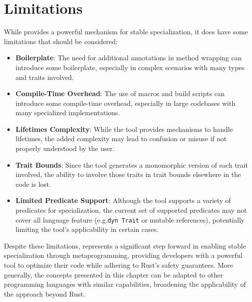 \section{Limitations}\label{sec:limitations}
While \mytool{} provides a powerful mechanism for stable specialization, it does have some limitations that should be considered:
\begin{itemize}
	\item \textbf{Boilerplate}: The need for additional annotations in method wrapping can introduce some boilerplate, especially in complex scenarios with many types and traits involved.
	\item \textbf{Compile-Time Overhead}: The use of macros and build scripts can introduce some compile-time overhead, especially in large codebases with many specialized implementations.
	\item \textbf{Lifetimes Complexity}: While the tool provides mechanisms to handle lifetimes, the added complexity may lead to confusion or misuse if not properly understood by the user.
	\item \textbf{Trait Bounds}: Since the tool generates a monomorphic version of each trait involved, the ability to involve those traits in trait bounds elsewhere in the code is lost.
	\item \textbf{Limited Predicate Support}: Although the tool supports a variety of predicates for specialization, the current set of supported predicates may not cover all language feature (e.g.\@ \texttt{dyn Trait} or mutable references), potentially limiting the tool's applicability in certain cases.
\end{itemize}
Despite these limitations, \mytool{} represents a significant step forward in enabling stable specialization through metaprogramming, providing developers with a powerful tool to optimize their code while adhering to Rust's safety guarantees.
More generally, the concepts presented in this chapter can be adapted to other programming languages with similar capabilities, broadening the applicability of the approach beyond Rust.
